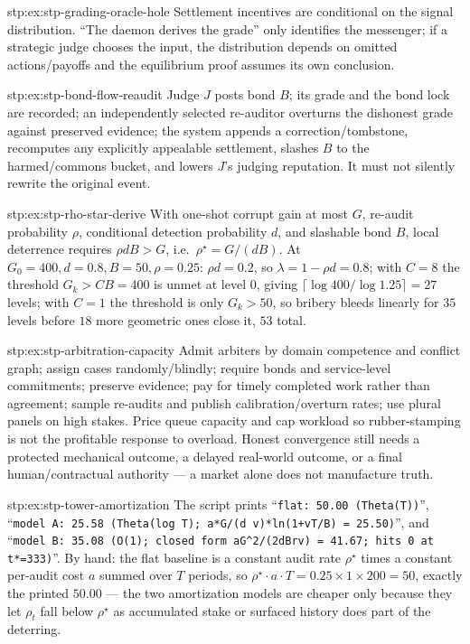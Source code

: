\begin{pdSolution}{stp:ex:stp-grading-oracle-hole}
Settlement incentives are conditional on the signal distribution. ``The
daemon derives the grade'' only identifies the messenger; if a strategic
judge chooses the input, the distribution depends on omitted actions/payoffs
and the equilibrium proof assumes its own conclusion.
\end{pdSolution}
\begin{pdSolution}{stp:ex:stp-bond-flow-reaudit}
Judge $J$ posts bond $B$; its grade and the bond lock are recorded; an
independently selected re-auditor overturns the dishonest grade against
preserved evidence; the system appends a correction/tombstone, recomputes any
explicitly appealable settlement, slashes $B$ to the harmed/commons bucket,
and lowers $J$'s judging reputation. It must not silently rewrite the
original event.
\end{pdSolution}
\begin{pdSolution}{stp:ex:stp-rho-star-derive}
With one-shot corrupt gain at most $G$, re-audit probability $\rho$,
conditional detection probability $d$, and slashable bond $B$, local
deterrence requires $\rho d B > G$, i.e.\ $\rho^\star=G/(dB)$. At
$G_0=400,d=0.8,B=50,\rho=0.25$: $\rho d=0.2$, so $\lambda=1-\rho d=0.8$; with
$C=8$ the threshold $G_k>CB=400$ is unmet at level $0$, giving
$\lceil\log 400/\log 1.25\rceil=27$ levels; with $C=1$ the threshold is only
$G_k>50$, so bribery bleeds linearly for $35$ levels before $18$ more
geometric ones close it, $53$ total.
\end{pdSolution}
\begin{pdSolution}{stp:ex:stp-arbitration-capacity}
Admit arbiters by domain competence and conflict graph; assign cases
randomly/blindly; require bonds and service-level commitments; preserve
evidence; pay for timely completed work rather than agreement; sample
re-audits and publish calibration/overturn rates; use plural panels on high
stakes. Price queue capacity and cap workload so rubber-stamping is not the
profitable response to overload. Honest convergence still needs a protected
mechanical outcome, a delayed real-world outcome, or a final human/contractual
authority --- a market alone does not manufacture truth.
\end{pdSolution}
\begin{pdSolution}{stp:ex:stp-tower-amortization}
The script prints ``\texttt{flat: 50.00 (Theta(T))}'', ``\texttt{model A:
25.58 (Theta(log T); a*G/(d v)*ln(1+vT/B) = 25.50)}'', and ``\texttt{model B:
35.08 (O(1); closed form aG\textasciicircum2/(2dBrv) = 41.67; hits 0 at
t*=333)}''. By hand: the flat baseline is a constant audit rate $\rho^\star$
times a constant per-audit cost $a$ summed over $T$ periods, so
$\rho^\star\cdot a\cdot T=0.25\times 1\times 200=50$, exactly the printed
$50.00$ --- the two amortization models are cheaper only because they let
$\rho_t$ fall below $\rho^\star$ as accumulated stake or surfaced history
does part of the deterring.
\end{pdSolution}
